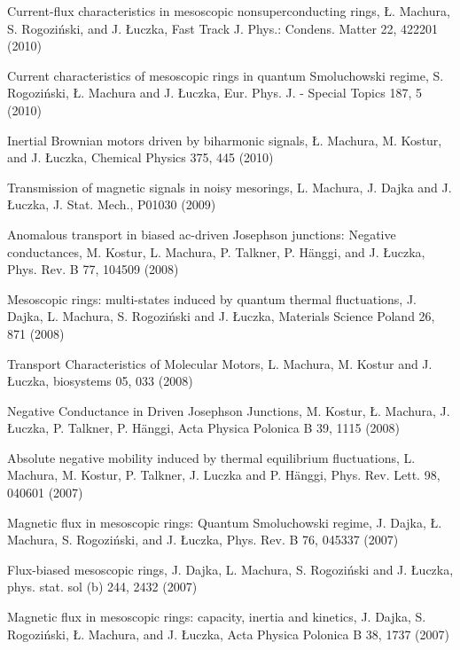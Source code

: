 \documentclass[11pt,a4paper,sans]{moderncv} %
\begin{document}
\begin{etaremune}
\item Current-flux characteristics in mesoscopic nonsuperconducting rings, Ł. Machura, S. Rogoziński, and J. Łuczka, Fast Track J. Phys.: Condens. Matter 22,  422201 (2010)

\item Current characteristics of mesoscopic rings in quantum Smoluchowski regime, S. Rogoziński, Ł. Machura and J. Łuczka, Eur. Phys. J. - Special Topics 187,  5 (2010)

\item Inertial Brownian motors driven by biharmonic signals, Ł. Machura, M. Kostur, and J. Łuczka, Chemical Physics 375,  445 (2010)

\item Transmission of magnetic signals in noisy mesorings, L. Machura, J. Dajka and J. Łuczka, J. Stat. Mech.,  P01030 (2009)

\item Anomalous transport in biased ac-driven Josephson junctions: Negative conductances, M. Kostur, L. Machura, P. Talkner, P. Hänggi, and J. Łuczka, Phys. Rev. B 77,  104509 (2008)

\item Mesoscopic rings: multi-states induced by quantum thermal fluctuations, J. Dajka, L. Machura, S. Rogoziński and J. Łuczka, Materials Science Poland 26,  871 (2008)

\item Transport Characteristics of Molecular Motors, L. Machura, M. Kostur and J. Łuczka, biosystems 05,  033 (2008)

\item Negative Conductance in Driven Josephson Junctions, M. Kostur, Ł. Machura, J. Łuczka, P. Talkner, P. Hänggi, Acta Physica Polonica B 39,  1115 (2008)

\item Absolute negative mobility induced by thermal equilibrium fluctuations, L. Machura, M. Kostur, P. Talkner, J. Luczka and P. Hänggi, Phys. Rev. Lett. 98,  040601 (2007)

\item Magnetic flux in mesoscopic rings: Quantum Smoluchowski regime, J. Dajka, Ł. Machura, S. Rogoziński, and J. Łuczka, Phys. Rev. B 76,  045337 (2007)

\item Flux-biased mesoscopic rings, J. Dajka, L. Machura, S. Rogoziński and J. Łuczka, phys. stat. sol (b) 244,  2432 (2007)

\item Magnetic flux in mesoscopic rings: capacity, inertia and kinetics, J. Dajka, S. Rogoziński, Ł. Machura, and J. Łuczka, Acta Physica Polonica B 38,  1737 (2007)


\end{etaremune}
\end{document}
